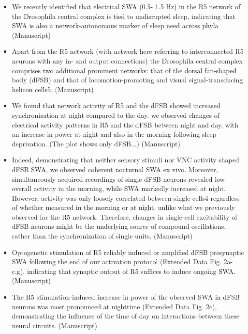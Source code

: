 \documentclass[11pt]{article}
\begin{document}
\begin{itemize}
    \item  We recently identified that electrical SWA (0.5-
    1.5 Hz) in the R5 network of the Drosophila central complex is tied to undisrupted sleep, indicating that SWA is also a network-autonomous marker of sleep need across phyla
    \cite{raccugliaCoherentMultilevelNetwork2022} (Manuscript)

    \item Apart from the R5
    network (with network here referring to interconnected R5 neurons with any in- and output
    connections) the Drosophila central complex comprises two additional prominent networks:
    that of the dorsal fan-shaped body (dFSB) and that of locomotion-promoting and visual
    signal-transducing helicon cells5.
    \cite{raccugliaCoherentMultilevelNetwork2022} (Manuscript)

    \item We
    found that network activity of R5 and the dFSB showed increased synchronization at night compared to the day.
    we observed changes of electrical activity patterns in
    R5 and the dFSB between night and day, with an increase in power at night and also in the
    morning following sleep deprivation. (The plot shows only dFSB...)
    \cite{raccugliaCoherentMultilevelNetwork2022} (Manuscript)

    \item Indeed, demonstrating that neither
    sensory stimuli nor VNC activity shaped dFSB SWA, we observed coherent nocturnal SWA ex
    vivo. Moreover, simultaneously acquired recordings of single dFSB
    neurons revealed low overall activity in the morning, while SWA markedly increased at night.
    However, activity was only loosely correlated between single cells4
    regardless of whether measured in the morning or at night, unlike
    what we previously observed for the R5 network. Therefore, changes in single-cell excitability
    of dFSB neurons might be the underlying source of compound oscillations, rather than the
    synchronization of single units.
    \cite{raccugliaCoherentMultilevelNetwork2022} (Manuscript)

    \item  Optogenetic stimulation of R5 reliably induced or amplified dFSB presynaptic SWA
    following the end of our activation protocol (Extended Data Fig. 2a-c,g), indicating that
    synaptic output of R5 suffices to induce ongoing SWA.
    \cite{raccugliaCoherentMultilevelNetwork2022} (Manuscript)

    \item The R5 stimulation-induced increase in
    power of the observed SWA in dFSB neurons was most pronounced at nighttime (Extended
    Data Fig. 2c), demonstrating the influence of the time of day on interactions between these
    neural circuits.
    \cite{raccugliaCoherentMultilevelNetwork2022} (Manuscript)


\end{itemize}
\end{document}
